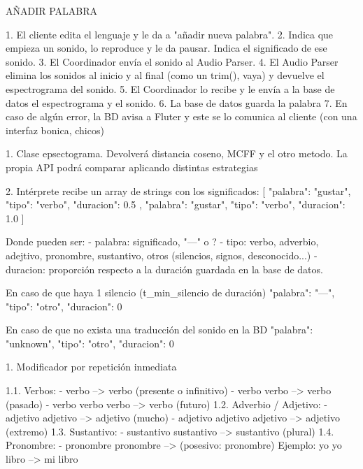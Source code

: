 AÑADIR PALABRA

1. El cliente edita el lenguaje y le da a "añadir nueva palabra".
2. Indica que empieza un sonido, lo reproduce y le da pausar. Indica el significado de ese sonido.
3. El Coordinador envía el sonido al Audio Parser.
4. El Audio Parser elimina los sonidos al inicio y al final (como un trim(), vaya) y devuelve el espectrograma del sonido.
5. El Coordinador lo recibe y le envía a la base de datos el espectrograma y el sonido.
6. La base de datos guarda la palabra
7. En caso de algún error, la BD avisa a Fluter y este se lo comunica al cliente (con una interfaz bonica, chicos)




1. Clase epsectograma. Devolverá distancia coseno, MCFF y el otro metodo. La propia API podrá comparar aplicando distintas estrategias

2. Intérprete recibe un array de strings con los significados:
    [
    {
        "palabra": "gustar",
        "tipo": "verbo",
        "duracion": 0.5
    },
    {
        "palabra": "gustar",
        "tipo": "verbo",
        "duracion": 1.0
    }
    ]

    Donde pueden ser:
        - palabra: significado, "---" o ?
        - tipo: verbo, adverbio, adejtivo, pronombre, sustantivo, otros (silencios, signos, desconocido...)
        - duracion: proporción respecto a la duración guardada en la base de datos.

    En caso de que haya 1 silencio (t_min_silencio de duración)
    {
        "palabra": "---",
        "tipo": "otro",
        "duracion": 0
    }

    En caso de que no exista una traducción del sonido en la BD
    {
        "palabra": "unknown",
        "tipo": "otro",
        "duracion": 0
    }




1. Modificador por repetición inmediata

    1.1. Verbos: 
        - verbo --> verbo (presente o infinitivo)
        - verbo verbo --> verbo (pasado)
        - verbo verbo verbo --> verbo (futuro)
    1.2. Adverbio / Adjetivo:
        - adjetivo adjetivo --> adjetivo (mucho)
        - adjetivo adjetivo adjetivo --> adjetivo (extremo)
    1.3. Sustantivo:
        - sustantivo sustantivo --> sustantivo (plural)
    1.4. Pronombre: 
        - pronombre pronombre --> (posesivo: pronombre)
            Ejemplo: yo yo libro --> mi libro 

